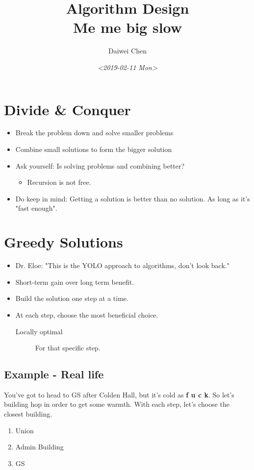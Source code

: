 \documentclass{article}
\author{Daiwei Chen}
\date{\textit{<2019-02-11 Mon>}}
\title{Algorithm Design\\\medskip
\large Me me big slow}
\begin{document}
\maketitle
\tableofcontents


\section{Divide \& Conquer}
\label{sec:orgb2cbcf6}
\begin{itemize}
\item Break the problem down and solve smaller problems
\item Combine small solutions to form the bigger solution
\item Ask yourself: Is solving problems and combining better?
\begin{itemize}
\item Recursion is not free.
\end{itemize}
\item Do keep in mind: Getting a solution is better than no solution. As long as it's "fast enough".
\end{itemize}

\section{Greedy Solutions}
\label{sec:org6285ef7}
\begin{itemize}
\item Dr. Eloe: "This is the YOLO approach to algorithms, don't look back."
\item Short-term gain over long term benefit.
\item Build the solution one step at a time.
\item At each step, choose the most beneficial choice.
\begin{description}
\item[{Locally optimal}] For that specific step.
\end{description}
\end{itemize}
\subsection{Example - Real life}
\label{sec:orgac26524}
You've got to head to GS after Colden Hall, but it's cold as \textbf{f u c k}. So let's building hop in order to get some warmth. With each step, let's choose the closest building.
\begin{enumerate}
\item Union
\item Admin Building
\item GS
\end{enumerate}
\end{document}
